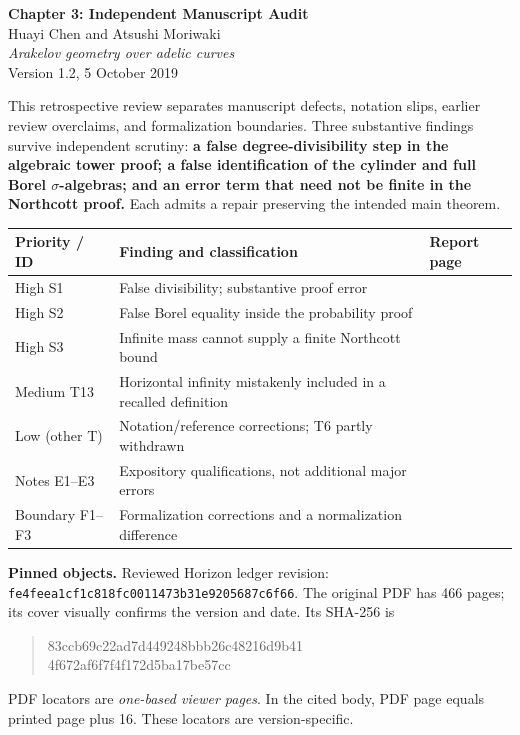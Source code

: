 \documentclass[11pt,a4paper]{article}
\newcommand{\code}[1]{{\small\nolinkurl{#1}}}
\begin{document}
\thispagestyle{plain}
\begin{center}
{\LARGE\bfseries\color{navy}Chapter 3: Independent Manuscript Audit}\\[7pt]
{\large Huayi Chen and Atsushi Moriwaki}\\[3pt]
{\itshape Arakelov geometry over adelic curves}\\[4pt]
{Version 1.2, 5 October 2019}\quad\textbar{}
\end{center}

This retrospective review separates manuscript defects, notation slips, earlier review overclaims, and formalization boundaries. Three substantive findings survive independent scrutiny: \textbf{a false degree-divisibility step in the algebraic tower proof; a false identification of the cylinder and full Borel $\sigma$-algebras; and an error term that need not be finite in the Northcott proof.} Each admits a repair preserving the intended main theorem.

\begin{center}\small
\begin{tabularx}{\linewidth}{@{}lYl@{}}\toprule
Priority / ID & Finding and classification & Report page\\\midrule
High S1 & False divisibility; substantive proof error & \pageref{s1}\\
High S2 & False Borel equality inside the probability proof & \pageref{s2}\\
High S3 & Infinite mass cannot supply a finite Northcott bound & \pageref{s3}\\
Medium T13 & Horizontal infinity mistakenly included in a recalled definition & \pageref{horizontal}\\
Low (other T) & Notation/reference corrections; T6 partly withdrawn & \pageref{notation}\\
Notes E1--E3 & Expository qualifications, not additional major errors & \pageref{e1}\\
Boundary F1--F3 & Formalization corrections and a normalization difference & \pageref{formal}\\\bottomrule
\end{tabularx}
\end{center}

\noindent\textbf{Pinned objects.}
Reviewed Horizon ledger revision:
\code{fe4feea1cf1c818fc0011473b31e9205687c6f66}.
The original PDF has 466 pages; its cover visually confirms the version and date.
Its SHA-256 is
\begin{quote}\small\ttfamily
83ccb69c22ad7d449248bbb26c48216d9b41\\
4f672af6f7f4f172d5ba17be57cc
\end{quote}
PDF locators are \emph{one-based viewer pages}. In the cited body, PDF page equals printed page plus 16. These locators are version-specific.
\end{document}
